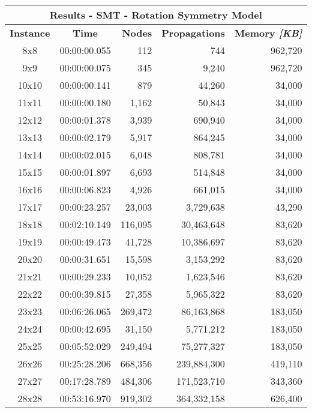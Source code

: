 
\begin{center}
    \begin{tabular}{|c|c|r|r|r|}
        \hline
        \multicolumn{5}{|c|}{\textbf{Results - SMT - Rotation Symmetry Model}} \\
        \hline
        \textbf{Instance} & \textbf{Time} & \textbf{Nodes} & \textbf{Propagations} & \textbf{Memory \textit{[KB]}} \\
        
        \hline
		8x8 & 00:00:00.055 & 112 & 744 & 962,720 \\ \hline
		9x9 & 00:00:00.075 & 345 & 9,240 & 962,720 \\ \hline
		10x10 & 00:00:00.141 & 879 & 44,260 & 34,000 \\ \hline
		11x11 & 00:00:00.180 & 1,162 & 50,843 & 34,000 \\ \hline
		12x12 & 00:00:01.378 & 3,939 & 690,940 & 34,000 \\ \hline
		13x13 & 00:00:02.179 & 5,917 & 864,245 & 34,000 \\ \hline
		14x14 & 00:00:02.015 & 6,048 & 808,781 & 34,000 \\ \hline
		15x15 & 00:00:01.897 & 6,693 & 514,848 & 34,000 \\ \hline
		16x16 & 00:00:06.823 & 4,926 & 661,015 & 34,000 \\ \hline
		17x17 & 00:00:23.257 & 23,003 & 3,729,638 & 43,290 \\ \hline
		18x18 & 00:02:10.149 & 116,095 & 30,463,648 & 83,620 \\ \hline
		19x19 & 00:00:49.473 & 41,728 & 10,386,697 & 83,620 \\ \hline
		20x20 & 00:00:31.651 & 15,598 & 3,153,292 & 83,620 \\ \hline
		21x21 & 00:00:29.233 & 10,052 & 1,623,546 & 83,620 \\ \hline
		22x22 & 00:00:39.815 & 27,358 & 5,965,322 & 83,620 \\ \hline
		23x23 & 00:06:26.065 & 269,472 & 86,163,868 & 183,050 \\ \hline
		24x24 & 00:00:42.695 & 31,150 & 5,771,212 & 183,050 \\ \hline
		25x25 & 00:05:52.029 & 249,494 & 75,277,327 & 183,050 \\ \hline
		26x26 & 00:25:28.206 & 668,356 & 239,884,300 & 419,110 \\ \hline
		27x27 & 00:17:28.789 & 484,306 & 171,523,710 & 343,360 \\ \hline
		28x28 & 00:53:16.970 & 919,302 & 364,332,158 & 626,400 \\ \hline

\end{tabular}
\end{center}

